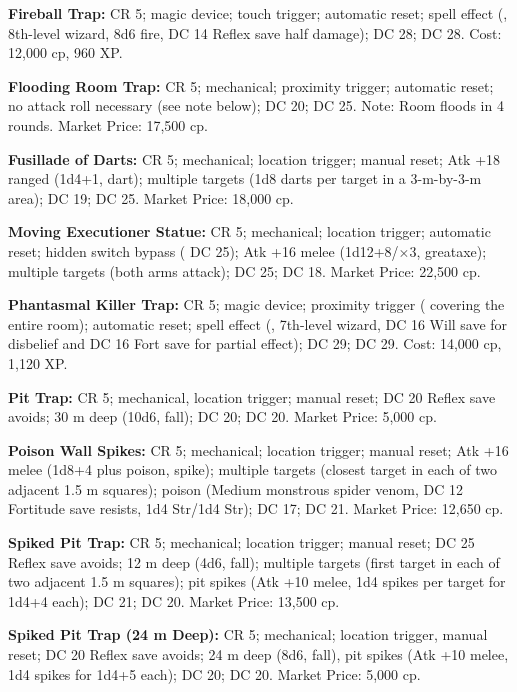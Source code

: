 \textbf{Fireball Trap:} CR 5; magic device; touch trigger; automatic reset; spell effect (, 8th-level wizard, 8d6 fire, DC 14 Reflex save half damage);  DC 28;  DC 28. Cost: 12,000 cp, 960 XP.

\textbf{Flooding Room Trap:} CR 5; mechanical; proximity trigger; automatic reset; no attack roll necessary (see note below);  DC 20;  DC 25. Note: Room floods in 4 rounds. Market Price: 17,500 cp.

\textbf{Fusillade of Darts:} CR 5; mechanical; location trigger; manual reset; Atk +18 ranged (1d4+1, dart); multiple targets (1d8 darts per target in a 3-m-by-3-m area);  DC 19;  DC 25. Market Price: 18,000 cp.

\textbf{Moving Executioner Statue:} CR 5; mechanical; location trigger; automatic reset; hidden switch bypass ( DC 25); Atk +16 melee (1d12+8/$\times$3, greataxe); multiple targets (both arms attack);  DC 25;  DC 18. Market Price: 22,500 cp.

\textbf{Phantasmal Killer Trap:} CR 5; magic device; proximity trigger ( covering the entire room); automatic reset; spell effect (, 7th-level wizard, DC 16 Will save for disbelief and DC 16 Fort save for partial effect);  DC 29;  DC 29. Cost: 14,000 cp, 1,120 XP.

\textbf{Pit Trap:} CR 5; mechanical, location trigger; manual reset; DC 20 Reflex save avoids; 30 m deep (10d6, fall);  DC 20;  DC 20. Market Price: 5,000 cp.

\textbf{Poison Wall Spikes:} CR 5; mechanical; location trigger; manual reset; Atk +16 melee (1d8+4 plus poison, spike); multiple targets (closest target in each of two adjacent 1.5 m squares); poison (Medium monstrous spider venom, DC 12 Fortitude save resists, 1d4 Str/1d4 Str);  DC 17;  DC 21. Market Price: 12,650 cp.

\textbf{Spiked Pit Trap:} CR 5; mechanical; location trigger; manual reset; DC 25 Reflex save avoids; 12 m deep (4d6, fall); multiple targets (first target in each of two adjacent 1.5 m squares); pit spikes (Atk +10 melee, 1d4 spikes per target for 1d4+4 each);  DC 21;  DC 20. Market Price: 13,500 cp.

\textbf{Spiked Pit Trap (24 m Deep):} CR 5; mechanical; location trigger, manual reset; DC 20 Reflex save avoids; 24 m deep (8d6, fall), pit spikes (Atk +10 melee, 1d4 spikes for 1d4+5 each);  DC 20;  DC 20. Market Price: 5,000 cp.

